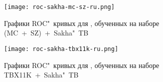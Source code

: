\begin{figure}[ht]%
	\centering
	\texttt{[image: roc-sakha-mc-sz-ru.png]}
	\caption{Графики ROC"~кривых для , обученных на наборе (MC~+~SZ)~+~Sakha"~TB}\label{fig-roc-mc-sz-sakha}
\end{figure}


\begin{figure}[ht]%
	\centering
	\texttt{[image: roc-sakha-tbx11k-ru.png]}
	\caption{Графики ROC"~кривых для , обученных на наборе TBX11K~+~Sakha"~TB}\label{fig-roc-tbx11k-sakha}
\end{figure}





